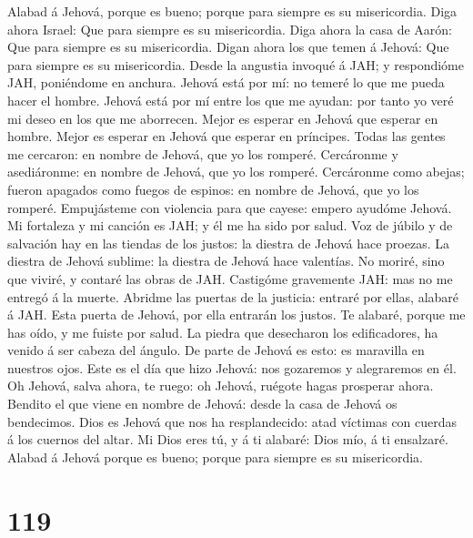  Alabad á Jehová, porque es bueno; porque para siempre es su
misericordia.  Diga ahora Israel: Que para siempre es su
misericordia.  Diga ahora la casa de Aarón: Que para siempre
es su misericordia.  Digan ahora los que temen á Jehová: Que
para siempre es su misericordia.  Desde la angustia invoqué
á JAH; y respondióme JAH, poniéndome en anchura.  Jehová
está por mí: no temeré lo que me pueda hacer el hombre. 
Jehová está por mí entre los que me ayudan: por tanto yo veré mi deseo
en los que me aborrecen.  Mejor es esperar en Jehová que
esperar en hombre.  Mejor es esperar en Jehová que esperar
en príncipes.  Todas las gentes me cercaron: en nombre de
Jehová, que yo los romperé.  Cercáronme y asediáronme: en
nombre de Jehová, que yo los romperé.  Cercáronme como
abejas; fueron apagados como fuegos de espinos: en nombre de Jehová, que
yo los romperé.  Empujásteme con violencia para que cayese:
empero ayudóme Jehová.  Mi fortaleza y mi canción es JAH; y
él me ha sido por salud.  Voz de júbilo y de salvación hay
en las tiendas de los justos: la diestra de Jehová hace proezas.
 La diestra de Jehová sublime: la diestra de Jehová hace
valentías.  No moriré, sino que viviré, y contaré las obras
de JAH.  Castigóme gravemente JAH: mas no me entregó á la
muerte.  Abridme las puertas de la justicia: entraré por
ellas, alabaré á JAH.  Esta puerta de Jehová, por ella
entrarán los justos.  Te alabaré, porque me has oído, y me
fuiste por salud.  La piedra que desecharon los
edificadores, ha venido á ser cabeza del ángulo.  De parte
de Jehová es esto: es maravilla en nuestros ojos.  Este es
el día que hizo Jehová: nos gozaremos y alegraremos en él. 
Oh Jehová, salva ahora, te ruego: oh Jehová, ruégote hagas prosperar
ahora.  Bendito el que viene en nombre de Jehová: desde la
casa de Jehová os bendecimos.  Dios es Jehová que nos ha
resplandecido: atad víctimas con cuerdas á los cuernos del altar.
 Mi Dios eres tú, y á ti alabaré: Dios mío, á ti ensalzaré.
 Alabad á Jehová porque es bueno; porque para siempre es su
misericordia.

\hypertarget{section-118}{%
\section{119}\label{section-118}}


